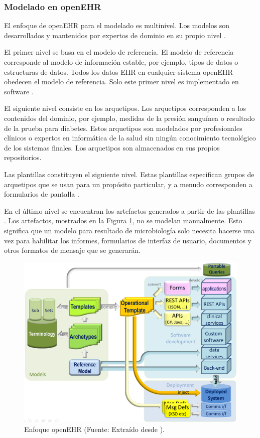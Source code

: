 \subsubsection{Modelado en openEHR}

El enfoque de openEHR para el modelado es multinivel. Los modelos son desarrollados y mantenidos por expertos de dominio en su propio nivel \cite{openEHRArchitecture}.

El primer nivel se basa en el modelo de referencia. El modelo de referencia corresponde al modelo de información estable, por ejemplo, tipos de datos o estructuras de datos. Todos los datos EHR en cualquier sistema openEHR obedecen el modelo de referencia. Solo este primer nivel es implementado en software \cite{openEHRArchitecture}.

El siguiente nivel consiste en los arquetipos. Los arquetipos corresponden a los contenidos del dominio, por ejemplo, medidas de la presión sanguínea o resultado de la prueba para diabetes. Estos arquetipos son modelados por profesionales clínicos o expertos en informática de la salud sin ningún conocimiento tecnológico de los sistemas finales. Los arquetipos son almacenados en sus propios repositorios.

Las plantillas constituyen el siguiente nivel. Estas plantillas especifican grupos de arquetipos que se usan para un propósito particular, y a menudo corresponden a formularios de pantalla \cite{openEHRArchitecture}.

En el último nivel se encuentran los artefactos generados a partir de las plantillas \cite{openEHR}. Los artefactos, mostrados en la Figura \ref{fig:openeEHR_ecosystem}, no se modelan manualmente. Esto significa que un modelo para resultado de microbiología solo necesita hacerse una vez para habilitar los informes, formularios de interfaz de usuario, documentos y otros formatos de mensaje que se generarán.

\begin{figure}[h]
  \centering
  \includegraphics[scale=0.6]{./images/openehr_dev_ecosystem}
  \caption{Enfoque openEHR (Fuente: Extraído desde \cite{openEHR}).}
  \label{fig:openeEHR_ecosystem}
\end{figure}
